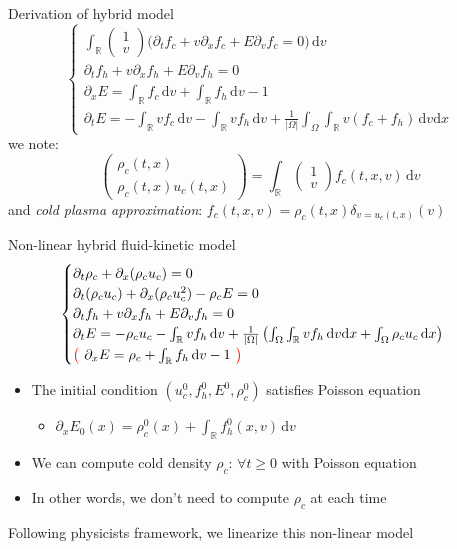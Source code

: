 \documentclass{beamer}
\begin{document}
\begin{frame}{Derivation of hybrid model}
  $$
    \begin{cases}
      \int_\mathbb{R} \begin{pmatrix}1\\v\end{pmatrix} \Big( \partial_t f_c + v\partial_xf_c + E\partial_v f_c = 0 \Big)\,\mathrm{d}v \\
      \partial_t f_h + v\partial_xf_h + E\partial_vf_h = 0 \\
      \partial_x E = \int_\mathbb{R}f_c\,\mathrm{d}v + \int_\mathbb{R}f_h\,\mathrm{d}v - 1 \\
      \partial_t E = - \int_\mathbb{R}vf_c\,\mathrm{d}v - \int_\mathbb{R}vf_h\,\mathrm{d}v + \frac{1}{|\Omega|}\int_\Omega\int_\mathbb{R} v(f_c+f_h)\,\mathrm{d}v\mathrm{d}x
    \end{cases}
  $$
  we note: $$
    \begin{pmatrix}
      \rho_c(t,x)\\ \rho_c(t,x)u_c(t,x)
    \end{pmatrix} = \int_\mathbb{R}\begin{pmatrix}1\\v\end{pmatrix}f_c(t,x,v)\,\mathrm{d}v
  $$
  and \emph{cold plasma approximation}: $f_c(t,x,v) = \rho_c(t,x)\delta_{v=u_c(t,x)}(v)$
\end{frame}
\begin{frame}{Non-linear hybrid fluid-kinetic model}
  $$
    \begin{cases}
      \partial_t \rho_c + \partial_x(\rho_cu_c) = 0\\
      \partial_t(\rho_cu_c) + \partial_x(\rho_cu_c^2)-\rho_cE = 0\\
      \partial_tf_h + v\partial_xf_h + E\partial_vf_h = 0\\
      \partial_tE = -\rho_cu_c - \int_\mathbb{R}vf_h\,\mathrm{d}v + \frac{1}{|\Omega|}\left(\int_\Omega\int_\mathbb{R}vf_h\,\mathrm{d}v\mathrm{d}x + \int_\Omega\rho_cu_c\,\mathrm{d}x \right)\\
      {\color{red}\left(\phantom{\frac{}{}}\right.} \partial_xE = \rho_c + \int_\mathbb{R}f_h\,\mathrm{d}v - 1 {\color{red}\left.\phantom{\frac{}{}}\right)}
    \end{cases}
  $$
  \begin{itemize}
    \item The initial condition $(u_c^0,f_h^0,E^0,\rho_c^0)$ satisfies Poisson equation \begin{itemize}
      \item $\partial_x E_0(x) = \rho_c^0(x) + \int_\mathbb{R}f_h^0(x,v)\,\mathrm{d}v$
    \end{itemize}
    \item We can compute cold density $\rho_c$: $\forall t\geq0$ with Poisson equation
    \item In other words, we don't need to compute $\rho_c$ at each time
  \end{itemize}
  Following physicists framework, we linearize this non-linear model
\end{frame}
\end{document}
